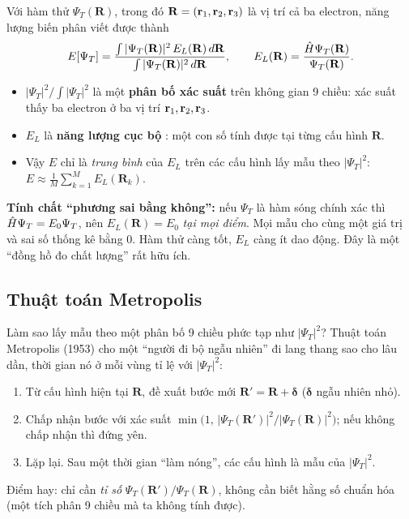 \begin{congthuc}
Với hàm thử $\Psi_T(\mathbf R)$, trong đó $\mathbf R=(\mathbf r_1,\mathbf r_2,\mathbf r_3)$ là vị trí cả ba electron, năng lượng biến phân viết được thành
\[
E[\Psi_T]=\frac{\int|\Psi_T(\mathbf R)|^2\,E_L(\mathbf R)\,d\mathbf R}{\int|\Psi_T(\mathbf R)|^2\,d\mathbf R},\qquad
E_L(\mathbf R)=\frac{\hat H\Psi_T(\mathbf R)}{\Psi_T(\mathbf R)} .
\]
\begin{itemize}
\item $|\Psi_T|^2/\!\int|\Psi_T|^2$ là một \textbf{phân bố xác suất} trên không gian 9 chiều: xác suất thấy ba electron ở ba vị trí $\mathbf r_1,\mathbf r_2,\mathbf r_3$.
\item $E_L$ là \textbf{năng lượng cục bộ} : một con số tính được tại từng cấu hình $\mathbf R$.
\item Vậy $E$ chỉ là \emph{trung bình} của $E_L$ trên các cấu hình lấy mẫu theo $|\Psi_T|^2$: $E\approx\frac1M\sum_{k=1}^M E_L(\mathbf R_k)$.
\end{itemize}
\textbf{Tính chất ``phương sai bằng không'':} nếu $\Psi_T$ là hàm sóng chính xác thì $\hat H\Psi_T=E_0\Psi_T$, nên $E_L(\mathbf R)=E_0$ \emph{tại mọi điểm}. Mọi mẫu cho cùng một giá trị và sai số thống kê bằng 0. Hàm thử càng tốt, $E_L$ càng ít dao động. Đây là một ``đồng hồ đo chất lượng'' rất hữu ích.
\end{congthuc}

\subsection{Thuật toán Metropolis}
Làm sao lấy mẫu theo một phân bố 9 chiều phức tạp như $|\Psi_T|^2$? Thuật toán Metropolis (1953) \cite{Metropolis1953} cho một ``người đi bộ ngẫu nhiên''  đi lang thang sao cho lâu dần, thời gian nó ở mỗi vùng tỉ lệ với $|\Psi_T|^2$:
\begin{enumerate}
\item Từ cấu hình hiện tại $\mathbf R$, đề xuất bước mới $\mathbf R'=\mathbf R+\boldsymbol\delta$ ($\boldsymbol\delta$ ngẫu nhiên nhỏ).
\item Chấp nhận bước với xác suất $\min\!\big(1,\,|\Psi_T(\mathbf R')|^2/|\Psi_T(\mathbf R)|^2\big)$; nếu không chấp nhận thì đứng yên.
\item Lặp lại. Sau một thời gian ``làm nóng'', các cấu hình là mẫu của $|\Psi_T|^2$.
\end{enumerate}
Điểm hay: chỉ cần \emph{tỉ số} $\Psi_T(\mathbf R')/\Psi_T(\mathbf R)$, không cần biết hằng số chuẩn hóa (một tích phân 9 chiều mà ta không tính được).


